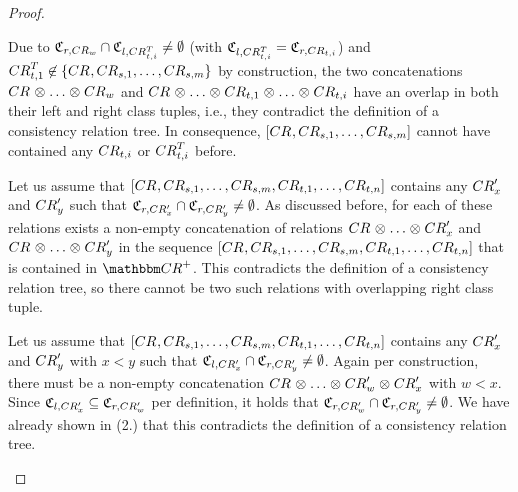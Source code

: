 \begin{proof}
\begin{longenumerate}
    Due to $\classtuple{C}{r,\consistencyrelation{CR}{w}} \cap \classtuple{C}{l,\consistencyrelation{CR}{t,i}^T} \neq \emptyset$ (with $\classtuple{C}{l,\consistencyrelation{CR}{t,i}^T} = \classtuple{C}{r,\consistencyrelation{CR}{t,i}}$) and $\consistencyrelation{CR}{t,1}^T \not\in \setted{\consistencyrelation{CR}{}, \consistencyrelation{CR}{s,1}, \dots, \consistencyrelation{CR}{s,m}}$ by construction, the two concatenations $\consistencyrelation{CR}{} \concat \dots \concat \consistencyrelation{CR}{w}$ and $\consistencyrelation{CR}{} \concat \dots \concat \consistencyrelation{CR}{t,1} \concat \dots \concat \consistencyrelation{CR}{t,i}$ have an overlap in both their left and right class tuples, i.e., they contradict the definition of a consistency relation tree.
    In consequence, $\sequenced{\consistencyrelation{CR}{}, \consistencyrelation{CR}{s,1}, \dots, \consistencyrelation{CR}{s,m}}$ cannot have contained any $\consistencyrelation{CR}{t,i}$ or $\consistencyrelation{CR}{t,i}^T$ before.
        \item 
    Let us assume that $\sequenced{\consistencyrelation{CR}{}, \consistencyrelation{CR}{s,1}, \dots, \consistencyrelation{CR}{s,m}, \consistencyrelation{CR}{t,1}, \dots, \consistencyrelation{CR}{t,n}}$ contains any $\consistencyrelation{CR}{x}'$ and $\consistencyrelation{CR}{y}'$ such that $\classtuple{C}{r,\consistencyrelation{CR}{x}'} \cap \classtuple{C}{r,\consistencyrelation{CR}{y}'} \neq \emptyset$.
    As discussed before, for each of these relations exists a non-empty concatenation of relations $\consistencyrelation{CR}{} \concat \dots \concat \consistencyrelation{CR}{x}'$ and $\consistencyrelation{CR}{} \concat \dots \concat \consistencyrelation{CR}{y}'$ in the sequence $\sequenced{\consistencyrelation{CR}{}, \consistencyrelation{CR}{s,1}, \dots, \consistencyrelation{CR}{s,m}, \consistencyrelation{CR}{t,1}, \dots, \consistencyrelation{CR}{t,n}}$ that is contained in $\transitiveclosure{\consistencyrelationset{CR}}$.
    This contradicts the definition of a consistency relation tree, so there cannot be two such relations with overlapping right class tuple.
        \item
    Let us assume that $\sequenced{\consistencyrelation{CR}{}, \consistencyrelation{CR}{s,1}, \dots, \consistencyrelation{CR}{s,m}, \consistencyrelation{CR}{t,1}, \dots, \consistencyrelation{CR}{t,n}}$ contains any $\consistencyrelation{CR}{x}'$ and $\consistencyrelation{CR}{y}'$ with $x < y$ such that $\classtuple{C}{l,\consistencyrelation{CR}{x}'} \cap \classtuple{C}{r,\consistencyrelation{CR}{y}'} \neq \emptyset$.
    Again per construction, there must be a non-empty concatenation $\consistencyrelation{CR}{} \concat \dots \concat \consistencyrelation{CR}{w}' \concat \consistencyrelation{CR}{x}'$ with $w < x$. Since $\classtuple{C}{l,\consistencyrelation{CR}{x}'} \subseteq \classtuple{C}{r,\consistencyrelation{CR}{w}'}$ per definition, it holds that
    $\classtuple{C}{r,\consistencyrelation{CR}{w}'} \cap \classtuple{C}{r,\consistencyrelation{CR}{y}'} \neq \emptyset$.
    We have already shown in (2.) that this contradicts the definition of a consistency relation tree.
    \end{longenumerate}


\end{proof}
